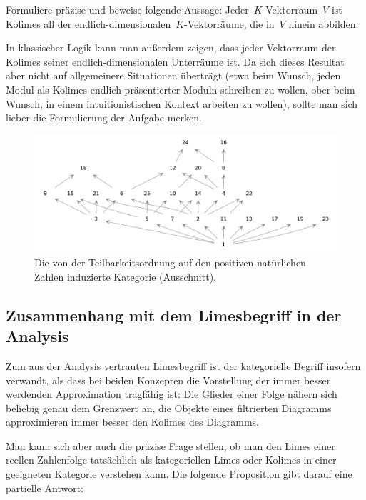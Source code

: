 \begin{aufg}Formuliere präzise und beweise folgende Aussage:
Jeder~$K$-Vektorraum~$V$ ist Kolimes all der
endlich-dimensionalen~$K$-Vektorräume, die in~$V$ hinein abbilden.
\end{aufg}

In klassischer Logik kann man außerdem zeigen, dass jeder Vektorraum der
Kolimes seiner endlich-dimensionalen Unterräume ist. Da sich dieses Resultat
aber nicht auf allgemeinere Situationen überträgt (etwa beim Wunsch, jeden
Modul als Kolimes endlich-präsentierter Moduln schreiben zu wollen, ober beim
Wunsch, in einem intuitionistischen Kontext arbeiten zu wollen), sollte man
sich lieber die Formulierung der Aufgabe merken.

\begin{figure}
  \centering
  \includegraphics[scale=0.35]{teilbarkeitsordnung.png}
  \caption{\label{teilbarkeitsordnung}Die von der Teilbarkeitsordnung auf den
  positiven natürlichen Zahlen induzierte Kategorie (Ausschnitt).}
\end{figure}


\subsection{Zusammenhang mit dem Limesbegriff in der Analysis}

Zum aus der Analysis vertrauten Limesbegriff ist der kategorielle Begriff
insofern verwandt, als dass bei beiden Konzepten die Vorstellung der immer
besser werdenden Approximation tragfähig ist: Die Glieder einer Folge
nähern sich beliebig genau dem Grenzwert an, die Objekte eines filtrierten
Diagramms approximieren immer besser den Kolimes des Diagramms.

Man kann sich aber auch die präzise Frage stellen, ob man den Limes einer reellen
Zahlenfolge tatsächlich als kategoriellen Limes oder Kolimes in einer
geeigneten Kategorie verstehen kann. Die folgende Proposition gibt darauf eine
partielle Antwort:

